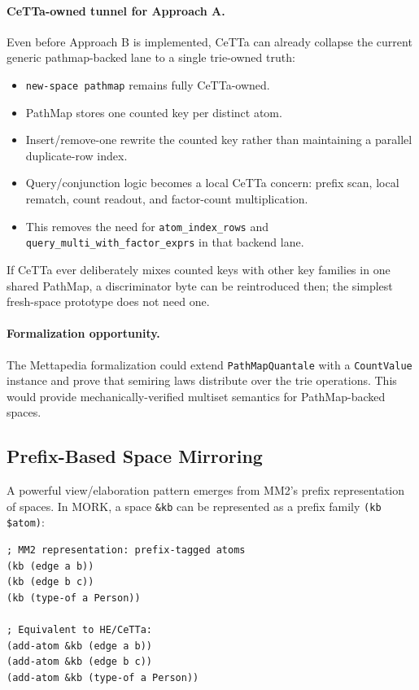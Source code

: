 \documentclass[11pt]{article}
\newcommand{\code}[1]{\texttt{#1}}
\newcommand{\PathMap}{\textup{PathMap}}
\newcommand{\MORK}{\textup{MORK}}
\begin{document}
\paragraph{CeTTa-owned tunnel for Approach A.}
Even before Approach B is implemented, CeTTa can already collapse the current
generic pathmap-backed lane to a single trie-owned truth:
\begin{itemize}[nosep]
  \item \code{new-space pathmap} remains fully CeTTa-owned.
  \item PathMap stores one counted key per distinct atom.
  \item Insert/remove-one rewrite the counted key rather than maintaining a
    parallel duplicate-row index.
  \item Query/conjunction logic becomes a local CeTTa concern: prefix scan,
    local rematch, count readout, and factor-count multiplication.
  \item This removes the need for \code{atom\_index\_rows} and
    \code{query\_multi\_with\_factor\_exprs} in that backend lane.
\end{itemize}
If CeTTa ever deliberately mixes counted keys with other key families in one
shared \PathMap{}, a discriminator byte can be reintroduced then; the simplest
fresh-space prototype does not need one.

\paragraph{Formalization opportunity.}
The Mettapedia formalization could extend \code{PathMapQuantale} with a
\code{CountValue} instance and prove that semiring laws distribute over
the trie operations.  This would provide mechanically-verified multiset
semantics for \PathMap{}-backed spaces.

\subsection{Prefix-Based Space Mirroring}
\label{sec:prefix-mirror}

A powerful view/elaboration pattern emerges from MM2's prefix representation
of spaces.  In \MORK{}, a space \code{\&kb} can be represented as a prefix
family \code{(kb \$atom)}:

\begin{lstlisting}
; MM2 representation: prefix-tagged atoms
(kb (edge a b))
(kb (edge b c))
(kb (type-of a Person))

; Equivalent to HE/CeTTa:
(add-atom &kb (edge a b))
(add-atom &kb (edge b c))
(add-atom &kb (type-of a Person))
\end{lstlisting}
\end{document}
